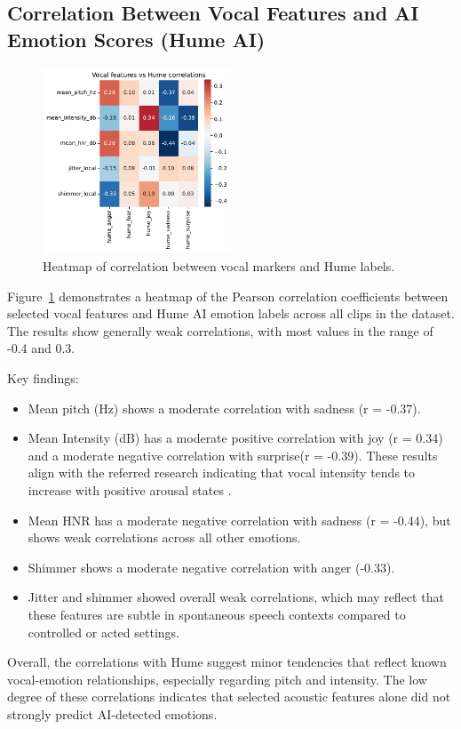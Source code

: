 \subsection{Correlation Between Vocal Features and AI Emotion Scores (Hume AI)}

\begin{figure}[H]
    \centering
    \includegraphics[width=0.5\textwidth]{png/results/rq1/vocal_features_vs_hume_correlations.pdf}
    \caption{Heatmap of correlation between vocal markers and Hume labels.}
    \label{fig:heatmap-voc-hume}
\end{figure}

Figure~\ref{fig:heatmap-voc-hume} demonstrates a heatmap of the Pearson correlation coefficients between selected vocal features and Hume AI emotion labels across all clips in the dataset. The results show generally weak correlations, with most values in the range of -0.4 and 0.3. 

\medskip
Key findings: 
\begin{itemize}
    \item Mean pitch (Hz) shows a moderate correlation with sadness (r = -0.37). 
    \item Mean Intensity (dB) has a moderate positive correlation with joy (r = 0.34) and a moderate negative correlation with surprise(r = -0.39). These results align with the referred research indicating that vocal intensity tends to increase with positive arousal states \autocite{Ekberg2023}. 
    \item Mean HNR has a moderate negative correlation with sadness (r = -0.44), but shows weak correlations across all other emotions.
    \item Shimmer shows a moderate negative correlation with anger (-0.33).
    \item Jitter and shimmer showed overall weak correlations, which may reflect that these features are subtle in spontaneous speech contexts compared to controlled or acted settings.  
\end{itemize}
Overall, the correlations with Hume suggest minor tendencies that reflect known vocal-emotion relationships, especially regarding pitch and intensity. The low degree of these correlations indicates that selected acoustic features alone did not strongly predict AI-detected emotions. 

